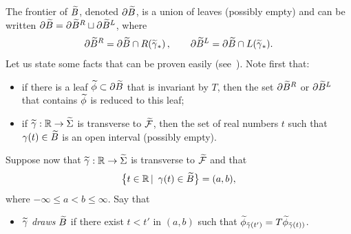 \documentclass[10pt,a4paper]{article}
\theoremstyle{definition}
\theoremstyle{plain}
\numberwithin{equation}{section}
\numberwithin{figure}{section}
\newcommand{\R}{\mathbb{R}}
\newcommand{\F}{\mathcal{F}}
\let\oldtilde\tilde
\renewcommand*{\tilde}[1]{\mathchoice{\widetilde{#1}}{\widetilde{#1}}{\oldtilde{#1}}{\oldtilde{#1}}}
\begin{document}
The frontier of $\tilde B$, denoted $\partial \tilde B$, is a union of leaves (possibly empty) and can be written $\partial\tilde B=\partial\tilde B^R\sqcup\partial\tilde B^L$, where
\[
\partial\tilde B^R=\partial\tilde B\cap R(\tilde\gamma_*)\,,\qquad \partial\tilde B^L=\partial\tilde B\cap L(\tilde\gamma_*).
\]
Let us state some facts that can be proven easily (see~\cite [Lemme~2.1.7]{Lel}). Note first that:
\begin{itemize}
\item if there is a leaf $\tilde \phi\subset \partial\tilde B$ that is invariant by $T$, then the set $ \partial\tilde B^R$ or $ \partial\tilde B^L$ that contains $\tilde\phi$ is reduced to this leaf;
\item if $\tilde\gamma:\R\to\tilde\Sigma$ is transverse to $\tilde{\F}$, then the set of real numbers $t$ such that $\gamma(t)\in\tilde B$ is an open interval (possibly empty).
\end{itemize}
Suppose now that $\tilde\gamma:\R\to\tilde\Sigma$ is transverse to $\tilde{\F}$ and that
\[
\big\{ t\in\R\,\vert\enskip \gamma(t)\in\tilde B\big\}=(a,b),
\]
where $-\infty\leq a<b\leq\infty$. Say that
\begin{itemize}
\item $\tilde\gamma$ \emph{draws $\tilde B$} if there exist $t<t'$ in $(a,b)$ such that $\tilde\phi_{\tilde\gamma(t')}=T\tilde\phi_{\tilde\gamma(t))}$.
\end{itemize}
\end{document}
